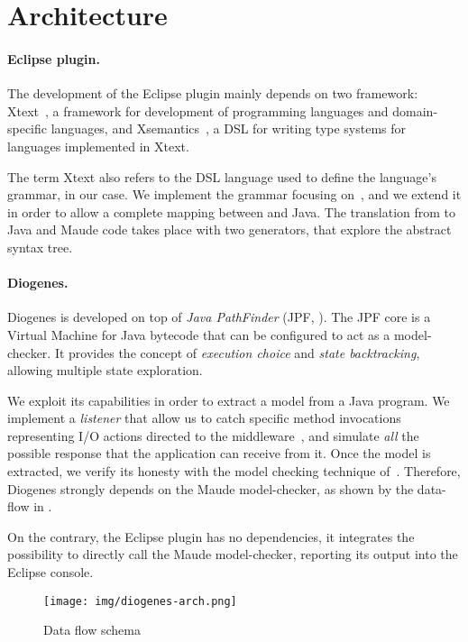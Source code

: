 \section{Architecture}

\paragraph{Eclipse plugin.}
The development of the Eclipse plugin mainly depends on
two framework: Xtext~\cite{xtext-site}, a framework for 
development of programming languages and domain-specific languages, and
Xsemantics~\cite{xsemantics-site}, a DSL for writing type systems
for languages implemented in Xtext.

The term Xtext also refers to the DSL language
used to define the language's grammar, \coco in our case.
We implement the grammar focusing on~\cite{verifiable},
and we extend it
in order to allow a complete mapping between \coco and Java.
%
The translation from \coco to Java and Maude code
takes place with two generators, that explore the abstract syntax tree. 

\paragraph{Diogenes.}
Diogenes is developed on top of \emph{Java PathFinder}
(JPF, \cite{lerda2001addressing,visser2003model}).
The JPF core is a Virtual Machine for Java bytecode
that can be configured to act as a model-checker.
It provides the concept of \emph{execution choice}
and \emph{state backtracking}, allowing multiple state exploration.

We exploit its capabilities in order to extract a \coco model
from a Java program. We implement a \emph{listener} that allow us
to catch specific method invocations representing I/O actions
directed to the middleware~\cite{CO2middleware},
and simulate \emph{all} the possible response that 
the application can receive from it.
Once the \coco model is extracted, we verify its honesty
with the model checking technique of~\cite{verifiable}.
Therefore, Diogenes strongly depends on the Maude model-checker,
as shown by the data-flow in .

On the contrary, the Eclipse plugin has no dependencies,
it integrates the possibility to directly call 
the Maude model-checker, reporting its output into the Eclipse console.

\begin{figure}[t]
    \texttt{[image: img/diogenes-arch.png]}
    \caption{Data flow schema}
    \label{fig:data-flow}
\end{figure}
